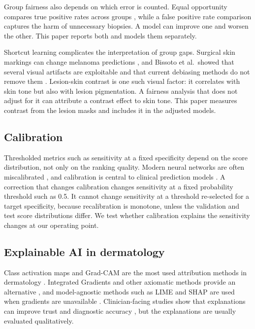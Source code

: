 \documentclass[11pt]{article}
\begin{document}
Group fairness also depends on which error is counted. Equal opportunity compares true positive rates across groups \citep{hardt2016equality}, while a false positive rate comparison captures the harm of unnecessary biopsies. A model can improve one and worsen the other. This paper reports both and models them separately.

Shortcut learning complicates the interpretation of group gaps. Surgical skin markings can change melanoma predictions \citep{winkler2019markings}, and Bissoto et al.\ showed that several visual artifacts are exploitable and that current debiasing methods do not remove them \citep{bissoto2020debiasing}. Lesion-skin contrast is one such visual factor: it correlates with skin tone but also with lesion pigmentation. A fairness analysis that does not adjust for it can attribute a contrast effect to skin tone. This paper measures contrast from the lesion masks and includes it in the adjusted models.

\subsection{Calibration}

Thresholded metrics such as sensitivity at a fixed specificity depend on the score distribution, not only on the ranking quality. Modern neural networks are often miscalibrated \citep{guo2017calibration}, and calibration is central to clinical prediction models \citep{vancalster2019calibration}. A correction that changes calibration changes sensitivity at a fixed probability threshold such as 0.5. It cannot change sensitivity at a threshold re-selected for a target specificity, because recalibration is monotone, unless the validation and test score distributions differ. We test whether calibration explains the sensitivity changes at our operating point.

\subsection{Explainable AI in dermatology}

Class activation maps and Grad-CAM are the most used attribution methods in dermatology \citep{zhou2016cam,selvaraju2017gradcam}. Integrated Gradients and other axiomatic methods provide an alternative \citep{sundararajan2017ig}, and model-agnostic methods such as LIME and SHAP are used when gradients are unavailable \citep{ribeiro2016lime,lundberg2017shap}. Clinician-facing studies show that explanations can improve trust and diagnostic accuracy \citep{chanda2024xai}, but the explanations are usually evaluated qualitatively.
\end{document}
